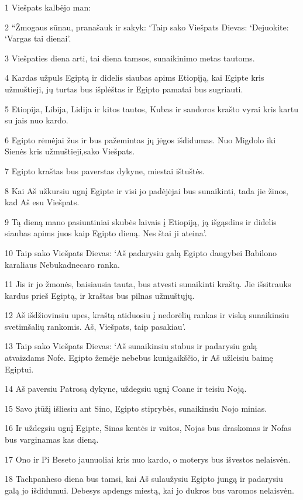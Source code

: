 \par 1 Viešpats kalbėjo man: 
\par 2 “Žmogaus sūnau, pranašauk ir sakyk: ‘Taip sako Viešpats Dievas: ‘Dejuokite: ‘Vargas tai dienai’. 
\par 3 Viešpaties diena arti, tai diena tamsos, sunaikinimo metas tautoms. 
\par 4 Kardas užpuls Egiptą ir didelis siaubas apims Etiopiją, kai Egipte kris užmuštieji, jų turtas bus išplėštas ir Egipto pamatai bus sugriauti. 
\par 5 Etiopija, Libija, Lidija ir kitos tautos, Kubas ir sandoros krašto vyrai kris kartu su jais nuo kardo. 
\par 6 Egipto rėmėjai žus ir bus pažemintas jų jėgos išdidumas. Nuo Migdolo iki Sienės kris užmuštieji,­sako Viešpats.­ 
\par 7 Egipto kraštas bus paverstas dykyne, miestai ištuštės. 
\par 8 Kai Aš užkursiu ugnį Egipte ir visi jo padėjėjai bus sunaikinti, tada jie žinos, kad Aš esu Viešpats. 
\par 9 Tą dieną mano pasiuntiniai skubės laivais į Etiopiją, ją išgąsdins ir didelis siaubas apims juos kaip Egipto dieną. Nes štai ji ateina’. 
\par 10 Taip sako Viešpats Dievas: ‘Aš padarysiu galą Egipto daugybei Babilono karaliaus Nebukadnecaro ranka. 
\par 11 Jis ir jo žmonės, baisiausia tauta, bus atvesti sunaikinti kraštą. Jie išsitrauks kardus prieš Egiptą, ir kraštas bus pilnas užmuštųjų. 
\par 12 Aš išdžiovinsiu upes, kraštą atiduosiu į nedorėlių rankas ir viską sunaikinsiu svetimšalių rankomis. Aš, Viešpats, taip pasakiau’. 
\par 13 Taip sako Viešpats Dievas: ‘Aš sunaikinsiu stabus ir padarysiu galą atvaizdams Nofe. Egipto žemėje nebebus kunigaikščio, ir Aš užleisiu baimę Egiptui. 
\par 14 Aš paversiu Patrosą dykyne, uždegsiu ugnį Coane ir teisiu Noją. 
\par 15 Savo įtūžį išliesiu ant Sino, Egipto stiprybės, sunaikinsiu Nojo minias. 
\par 16 Ir uždegsiu ugnį Egipte, Sinas kentės ir vaitos, Nojas bus draskomas ir Nofas bus varginamas kas dieną. 
\par 17 Ono ir Pi Beseto jaunuoliai kris nuo kardo, o moterys bus išvestos nelaisvėn. 
\par 18 Tachpanheso diena bus tamsi, kai Aš sulaužysiu Egipto jungą ir padarysiu galą jo išdidumui. Debesys apdengs miestą, kai jo dukros bus varomos nelaisvėn. 
